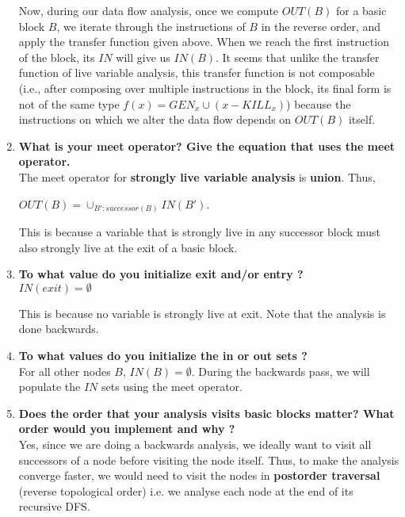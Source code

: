 \begin{enumerate}
Now, during our data flow analysis, once we compute $OUT(B)$ for a basic block $B$, we iterate through the instructions of $B$ in the reverse order, and apply the transfer function given above. When we reach the first instruction of the block, its $IN$ will give us $IN(B)$. It seems that unlike the transfer function of live variable analysis, this transfer function is not composable (i.e., after composing over multiple instructions in the block, its final form is not of the same type $f(x) = GEN_x \cup (x-KILL_x)$) because the instructions on which we alter the data flow depends on $OUT(B)$ itself.  

\item \textbf{What is your meet operator? Give the equation that uses the meet operator.} \\

  The meet operator for \textbf{strongly live variable analysis} is \textbf{union}. Thus,

  $OUT(B) = \cup_{B' : successor(B)} IN(B')$.

  This is because a variable that is strongly live in any successor block must also strongly live at the exit of a basic block. 

\item \textbf{To what value do you initialize exit and/or entry ?} \\

  $IN(exit) = \emptyset$

  This is because no variable is strongly live at exit. Note that the analysis is done backwards.

\item \textbf{To what values do you initialize the in or out sets ?} \\

  For all other nodes $B$, $IN(B) = \emptyset$. During the backwards pass, we will populate the $IN$ sets
  using the meet operator.

\item \textbf{Does the order that your analysis visits basic blocks matter? What order would you implement and why ?} \\

  Yes, since we are doing a backwards analysis, we ideally want to visit all successors of a node before visiting the node itself.
  Thus, to make the analysis converge faster, we would need to visit the nodes in \textbf{postorder traversal} (reverse topological order) i.e. we analyse each node
  at the end of its recursive DFS. 


\end{enumerate}
